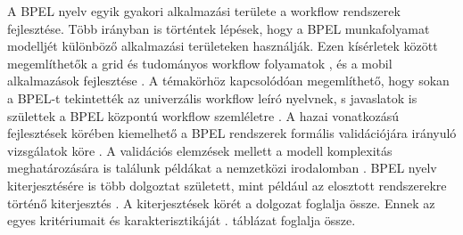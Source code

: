 A BPEL nyelv egyik gyakori alkalmazási területe a workflow rendszerek fejlesztése. Több irányban is történtek lépések, hogy a BPEL munkafolyamat modelljét különböző alkalmazási területeken használják. Ezen kísérletek között megemlíthetők a grid és tudományos  workflow folyamatok \cite{slominski2007adapting}, és a mobil alkalmazások fejlesztése \cite{hackmann2006sliver}. A témakörhöz kapcsolódóan megemlíthető, hogy sokan a BPEL-t tekintették az univerzális workflow leíró nyelvnek, s javaslatok is születtek a BPEL központú workflow szemléletre \cite{van2008translating}. A  hazai vonatkozású fejlesztések körében kiemelhető a BPEL rendszerek formális validációjára irányuló vizsgálatok köre \cite{kovacs2008formal}. A validációs elemzések mellett a modell komplexitás meghatározására is találunk példákat a nemzetközi irodalomban  \cite{cardoso2007complexity}. 
\newpage
BPEL nyelv kiterjesztésére is több dolgoztat született, mint például az elosztott rendszerekre történő kiterjesztés \cite{baresi2007towards}. A kiterjesztések körét a \cite{kopp2011classification} dolgozat foglalja össze. Ennek az egyes kritériumait és karakterisztikáját . táblázat foglalja össze.

